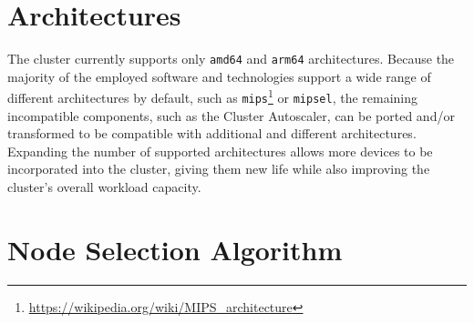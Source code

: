 \section{Architectures}
\label{subsec:conclusions_limitations_and_future_works_architectures}

The cluster currently supports only \texttt{amd64} and \texttt{arm64} architectures.
Because the majority of the employed software and technologies support a wide
range of different architectures by default, such as \texttt{mips}\footnote{\url{https://wikipedia.org/wiki/MIPS_architecture}}
or \texttt{mipsel}, the remaining incompatible components, such as the Cluster Autoscaler,
can be ported and/or transformed to be compatible with additional and different
architectures. \\ %
Expanding the number of supported architectures allows more devices to be
incorporated into the cluster, giving them new life while also improving the cluster's
overall workload capacity.

\section{Node Selection Algorithm}
\label{subsec:conclusions_limitations_and_future_works_node_selection_algorithm}

